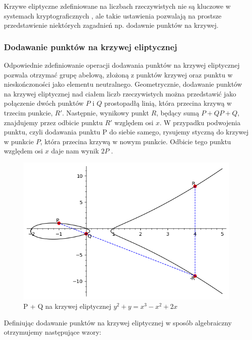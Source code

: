 Krzywe eliptyczne zdefiniowane na liczbach rzeczywistych nie są kluczowe w
systemach kryptograficznych \cite*{Stinson2021}, ale takie ustawienia
pozwalają na prostsze przedstawienie niektórych zagadnień
np. dodawnie punktów na krzywej.


\subsubsection{Dodawanie punktów na krzywej eliptycznej}
Odpowiednie zdefiniowanie operacji dodawania punktów na krzywej eliptycznej
pozwala otrzymać grupę abelową, złożoną z punktów krzywej oraz punktu w nieskończoności jako
elementu neutralnego.
\newline
\indent
Geometrycznie, dodawanie punktów na krzywej eliptycznej nad ciałem liczb rzeczywistych można przedstawić
jako połączenie dwóch punktów $P$ i $Q$ prostopadłą linią, która przecina krzywą w trzecim
punkcie, $R'$. Następnie, wynikowy punkt $R$, będący sumą $P+QP+Q$, znajdujemy przez
odbicie punktu $R'$ względem osi $x$. W przypadku podwojenia punktu, czyli dodawania
punktu P do siebie samego, rysujemy styczną do krzywej w punkcie $P$, która przecina
krzywą w nowym punkcie. Odbicie tego punktu względem osi $x$ daje nam wynik $2P$ \cite{Algorytmy}\cite{Stinson2021}.
\begin{figure}[!h]
    \centering \includegraphics[width=0.8\linewidth]{sage/elliptic_rational_point_addition.png}
    \caption{P + Q na krzywej eliptycznej $y^2+y=x^3-x^2+2x$}
\end{figure}
\par
Definiując dodawanie punktów na krzywej eliptycznej w sposób algebraiczny otrzymujemy następujące wzory:
